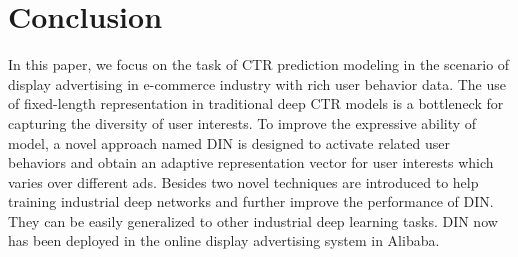 \section{Conclusion}
In this paper, we focus on the task of CTR prediction modeling in the scenario of display advertising in e-commerce industry with rich user behavior data.
The use of fixed-length representation in traditional deep CTR models is a bottleneck for capturing the diversity of user interests. 
To improve the expressive ability of model, a novel approach named DIN is designed to activate related user behaviors and obtain an adaptive representation vector for user interests which varies over different ads.    
Besides two novel techniques are introduced to help training industrial deep networks and further improve the performance of DIN. They can be easily generalized to other industrial deep learning tasks. 
DIN now has been deployed in the online display advertising system in Alibaba.  

